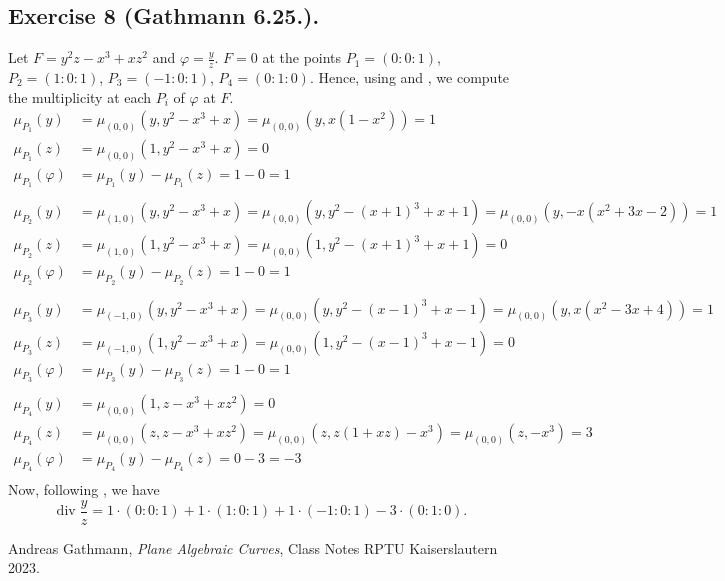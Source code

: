\documentclass[11pt,a4paper]{article}
\begin{document}
\newpage
\subsection*{Exercise 8 (Gathmann 6.25.).}
Let $ F = y^2 z - x^3 + xz^2 $ and $ \varphi = \frac{y}{z} $. $ F = 0$ at the points $ P_1 = (0:0:1) $, $ P_2 = (1:0:1) $, $ P_3 = (-1:0:1) $, $ P_4 = (0:1:0) $. Hence, using \cite[Construction 6.17]{gath} and \cite[Algorithm 2.12]{gath}, we compute the multiplicity at each $ P_i $ of $ \varphi $ at $ F $.
\begin{align*}
  \mu_{P_1}(y) &= \mu_{(0,0)}(y, y^2-x^3+x) = \mu_{(0,0)}(y, x(1-x^2)) = 1 \\
  \mu_{P_1}(z) &= \mu_{(0,0)}(1, y^2-x^3+x) = 0 \\
  \mu_{P_1}(\varphi) &= \mu_{P_1}(y) - \mu_{P_1}(z) = 1 - 0 = 1 \\
  \\
  \mu_{P_2}(y) &= \mu_{(1,0)}(y, y^2-x^3+x) = \mu_{(0,0)}(y, y^2-(x+1)^3+x+1) = \mu_{(0,0)}(y, -x(x^2+3x-2)) = 1 \\
  \mu_{P_2}(z) &= \mu_{(1,0)}(1, y^2-x^3+x) = \mu_{(0,0)}(1, y^2-(x+1)^3+x+1) = 0 \\
  \mu_{P_2}(\varphi) &= \mu_{P_2}(y) - \mu_{P_2}(z) = 1 - 0 = 1 \\
  \\
  \mu_{P_3}(y) &= \mu_{(-1,0)}(y, y^2-x^3+x) = \mu_{(0,0)}(y, y^2-(x-1)^3+x-1) = \mu_{(0,0)}(y, x(x^2-3x+4)) = 1 \\
  \mu_{P_3}(z) &= \mu_{(-1,0)}(1, y^2-x^3+x) = \mu_{(0,0)}(1, y^2-(x-1)^3+x-1) = 0 \\
  \mu_{P_3}(\varphi) &= \mu_{P_3}(y) - \mu_{P_3}(z) = 1 - 0 = 1 \\
  \\
  \mu_{P_4}(y) &= \mu_{(0,0)}(1, z-x^3+xz^2) = 0 \\
  \mu_{P_4}(z) &= \mu_{(0,0)}(z, z-x^3+xz^2) = \mu_{(0,0)}(z, z(1+xz)-x^3) = \mu_{(0,0)}(z, -x^3) = 3\\
  \mu_{P_4}(\varphi) &= \mu_{P_4}(y) - \mu_{P_4}(z) = 0 - 3 = -3 \\
\end{align*}
Now, following \cite[Construction 6.23]{gath}, we have
$$
  \operatorname{div}\frac{y}{z} = 1 \cdot (0:0:1) + 1 \cdot (1:0:1) + 1 \cdot (-1:0:1) - 3 \cdot (0:1:0).
$$

\begin{thebibliography}{9}

  Andreas Gathmann,
  \textit{Plane Algebraic Curves},
  Class Notes RPTU Kaiserslautern 2023.
  
\end{thebibliography}
\end{document}

